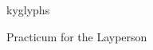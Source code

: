 \documentclass{article}
\begin{document}
\centerline{\sc \large kyglyphs}
\centerline{\sc Practicum for the Layperson }
\end{document}
